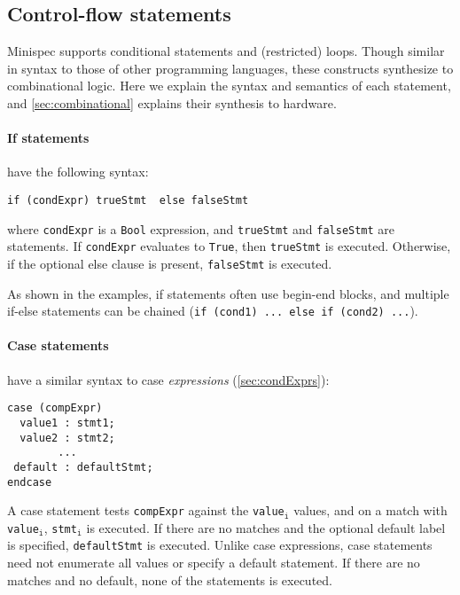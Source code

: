 
\subsection{Control-flow statements}
\label{sec:controlStmts}

Minispec supports conditional statements and (restricted) loops.
Though similar in syntax to those of other programming languages,
these constructs synthesize to combinational logic.
Here we explain the syntax and semantics of each statement,
and \autoref{sec:combinational} explains their synthesis to hardware.

\paragraph{If statements} have the following syntax:
\begin{center}
\verb|if (condExpr) trueStmt |\optStart\verb| else falseStmt |\optEnd
\end{center}
where \verb|condExpr| is a \verb|Bool| expression, and \verb|trueStmt| and \verb|falseStmt| are statements.
If \verb|condExpr| evaluates to \verb|True|, then \verb|trueStmt| is executed.
Otherwise, if the optional else clause is present, \verb|falseStmt| is executed.

As shown in the examples, if statements often use begin-end blocks, and
multiple if-else statements can be chained (\verb|if (cond1) ... else if (cond2) ...|).

\paragraph{Case statements} have a similar syntax to case \emph{expressions} (\autoref{sec:condExprs}):
\begin{center}
\verb|case (compExpr)           | \\
\verb|  value1 : stmt1;         | \\
\verb|  value2 : stmt2;         | \\
\verb|        ...               | \\
\verb|| \optStart \verb| default : defaultStmt; |\optEnd \\
\verb|endcase                   |
\end{center}
A case statement tests \verb|compExpr| against the \verb|value|$_{\texttt{i}}$ values,
and on a match with \verb|value|$_{\texttt{i}}$, \verb|stmt|$_{\texttt{i}}$ is executed.
If there are no matches and the optional default label is specified, \verb|defaultStmt| is executed.
Unlike case expressions, case statements need not enumerate all values or specify a default statement.
If there are no matches and no default, none of the statements is executed.

